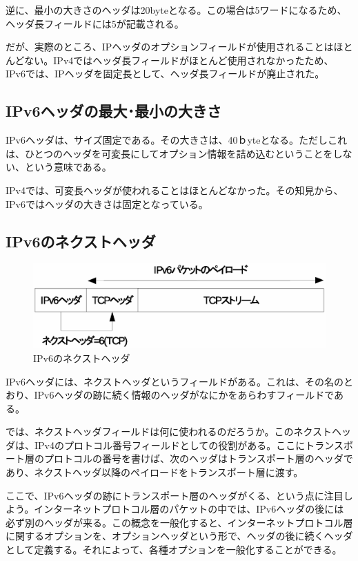 逆に、最小の大きさのヘッダは20byteとなる。この場合は5ワードになるため、ヘッダ長フィールドには5が記載される。

だが、実際のところ、IPヘッダのオプションフィールドが使用されることはほとんどない。IPv4ではヘッダ長フィールドがほとんど使用されなかったため、 IPv6では、IPヘッダを固定長として、ヘッダ長フィールドが廃止された。

\subsection{IPv6ヘッダの最大･最小の大きさ}
IPv6ヘッダは、サイズ固定である。その大きさは、40ｂyteとなる。ただしこれは、ひとつのヘッダを可変長にしてオプション情報を詰め込むということをしない、という意味である。

IPv4では、可変長ヘッダが使われることはほとんどなかった。その知見から、IPv6ではヘッダの大きさは固定となっている。

\subsection{IPv6のネクストヘッダ}
\begin{figure}
	\includegraphics[width=14cm,clip]{draw/nextheader1.eps}
	\caption{IPv6のネクストヘッダ}
	\label{fig:ipv6nextheader}
\end{figure}

IPv6ヘッダには、ネクストヘッダというフィールドがある。これは、その名のとおり、IPv6ヘッダの跡に続く情報のヘッダがなにかをあらわすフィールドである。

では、ネクストヘッダフィールドは何に使われるのだろうか。このネクストヘッダは、IPv4のプロトコル番号フィールドとしての役割がある。ここにトランスポート層のプロトコルの番号を書けば、次のヘッダはトランスポート層のヘッダであり、ネクストヘッダ以降のペイロードをトランスポート層に渡す。

ここで、IPv6ヘッダの跡にトランスポート層のヘッダがくる、という点に注目しよう。インターネットプロトコル層のパケットの中では、IPv6ヘッダの後には必ず別のヘッダが来る。この概念を一般化すると、インターネットプロトコル層に関するオプションを、オプションヘッダという形で、ヘッダの後に続くヘッダとして定義する。それによって、各種オプションを一般化することができる。

